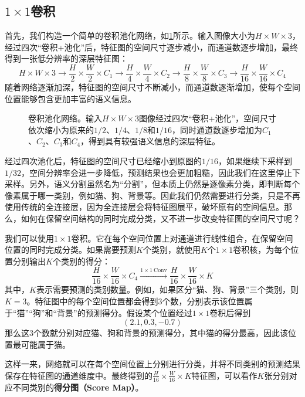 \subsection{$1\times1$卷积}

首先，我们构造一个简单的卷积池化网络，如\cref{fig:conv_pool}所示。输入图像大小为$H\times W\times3$，经过四次“卷积+池化”后，特征图的空间尺寸逐步减小，而通道数逐步增加，最终得到一张低分辨率的深层特征图：
$$
H\times W\times3 \rightarrow \frac{H}{2}\times\frac{W}{2}\times C_1 \rightarrow \frac{H}{4}\times\frac{W}{4}\times C_2 \rightarrow \frac{H}{8}\times\frac{W}{8}\times C_3 \rightarrow \frac{H}{16}\times\frac{W}{16}\times C_4
$$
随着网络逐渐加深，特征图的空间尺寸不断减小，而通道数逐渐增加，使每个空间位置能够包含更加丰富的语义信息。

\begin{figure}[H]
    \caption{卷积池化网络。输入$H\times W\times3$图像经过四次“卷积+池化”，空间尺寸依次缩小为原来的$1/2$、$1/4$、$1/8$和$1/16$，同时通道数逐步增加为$C_1$、$C_2$、$C_3$和$C_4$，得到具有较强语义信息的深层特征。}
    \label{fig:conv_pool}
\end{figure}

经过四次池化后，特征图的空间尺寸已经缩小到原图的$1/16$，如果继续下采样到$1/32$，空间分辨率会进一步降低，预测结果也会更加粗糙，因此我们在这里停止下采样。另外，语义分割虽然名为“分割”，但本质上仍然是逐像素分类，即判断每个像素属于哪一类别，例如猫、狗、背景等。因此我们仍然需要进行分类，只是不再使用传统的全连接层，因为全连接层会将特征图展平，破坏原有的空间信息。那么，如何在保留空间结构的同时完成分类，又不进一步改变特征图的空间尺寸呢？

我们可以使用$1\times1$卷积。它在每个空间位置上对通道进行线性组合，在保留空间位置的同时完成分类。如果需要预测$K$个类别，就使用$K$个$1\times1$卷积核，为每个位置分别输出$K$个类别的得分：
$$
\frac{H}{16}\times\frac{W}{16}\times C_4 \xrightarrow{1\times1\ \mathrm{Conv}} \frac{H}{16}\times\frac{W}{16}\times K
$$
其中，$K$表示需要预测的类别数量。例如，如果区分“猫、狗、背景”三个类别，则$K=3$。特征图中的每个空间位置都会得到3个数，分别表示该位置属于“猫”“狗”和“背景”的预测得分。假设某个位置经过$1\times1$卷积后得到
$$
(2.1,0.3,-0.7)
$$
那么这3个数就分别对应猫、狗和背景的预测得分，其中猫的得分最高，因此该位置最可能属于猫。

这样一来，网络就可以在每个空间位置上分别进行分类，并将不同类别的预测结果保存在特征图的通道维度中。最终得到的$\frac{H}{16}\times\frac{W}{16}\times K$特征图，可以看作$K$张分别对应不同类别的\textbf{得分图（Score Map）}。

